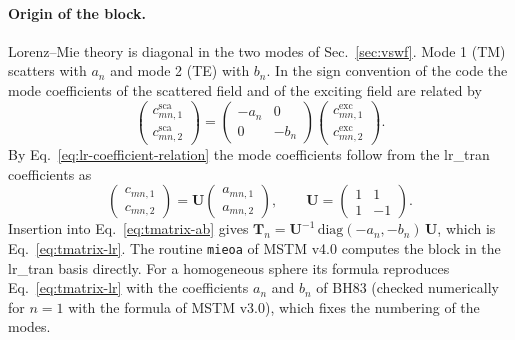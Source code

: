\documentclass[11pt,a4paper]{article}
\begin{document}
\paragraph{Origin of the block.}
Lorenz--Mie theory is diagonal in the two modes of Sec.~\ref{sec:vswf}.
Mode 1 (TM) scatters with $a_n$ and mode 2 (TE) with $b_n$.
In the sign convention of the code the mode coefficients of the scattered field and of the exciting field are related by
\begin{equation}
  \begin{pmatrix} c_{mn,1}^\mathrm{sca} \\ c_{mn,2}^\mathrm{sca} \end{pmatrix}
  = \begin{pmatrix} -a_n & 0 \\ 0 & -b_n \end{pmatrix}
    \begin{pmatrix} c_{mn,1}^\mathrm{exc} \\ c_{mn,2}^\mathrm{exc} \end{pmatrix}.
  \label{eq:tmatrix-ab}
\end{equation}
By Eq.~\eqref{eq:lr-coefficient-relation} the mode coefficients follow from the lr\_tran coefficients as
\begin{equation}
  \begin{pmatrix} c_{mn,1} \\ c_{mn,2} \end{pmatrix} = \mathbf{U} \begin{pmatrix} a_{mn,1} \\ a_{mn,2} \end{pmatrix}, \qquad
  \mathbf{U} = \begin{pmatrix} 1 & 1 \\ 1 & -1 \end{pmatrix}.
  \label{eq:lr-coefficients}
\end{equation}
Insertion into Eq.~\eqref{eq:tmatrix-ab} gives $\mathbf{T}_n = \mathbf{U}^{-1}\,\mathrm{diag}(-a_n, -b_n)\,\mathbf{U}$, which is Eq.~\eqref{eq:tmatrix-lr}.
The routine \texttt{mieoa} of MSTM v4.0 computes the block in the lr\_tran basis directly.
For a homogeneous sphere its formula reproduces Eq.~\eqref{eq:tmatrix-lr} with the coefficients $a_n$ and $b_n$ of BH83 (checked numerically for $n = 1$ with the formula of MSTM v3.0), which fixes the numbering of the modes.
\end{document}
